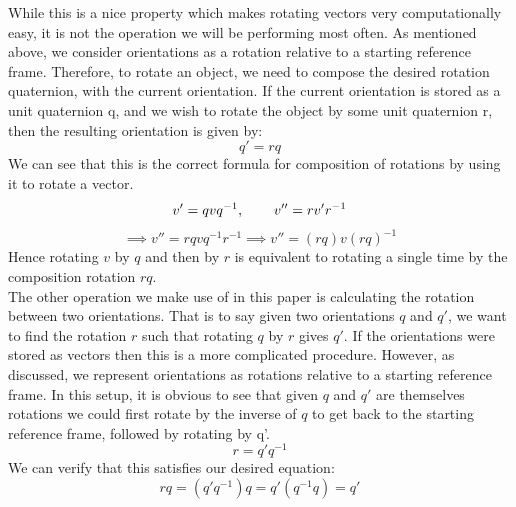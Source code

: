 While this is a nice property which makes rotating vectors very computationally easy, it is not the operation we will be performing most often. As mentioned above, we consider orientations as a rotation relative to a starting reference frame. Therefore, to rotate an object, we need to compose the desired rotation quaternion, with the current orientation. If the current orientation is stored as a unit quaternion q, and we wish to rotate the object by some unit quaternion r, then the resulting orientation is given by:
$$q' = rq$$
We can see that this is the correct formula for composition of rotations by using it to rotate a vector.
$$v' = qvq^{-1}, \operatorname{\operatorname{\: \: \: \:} \operatorname{\: \: \: \:}} v'' = rv'r^{-1}$$
$$\implies v'' = rqvq^{-1}r^{-1} \implies v'' = (rq)v(rq)^{-1}$$
Hence rotating $v$ by $q$ and then by $r$ is equivalent to rotating a single time by the composition rotation $rq$.\\

The other operation we make use of in this paper is calculating the rotation between two orientations. That is to say given two orientations $q$ and $q'$, we want to find the rotation $r$ such that rotating $q$ by $r$ gives $q'$. If the orientations were stored as vectors then this is a more complicated procedure. However, as discussed, we represent orientations as rotations relative to a starting reference frame. In this setup, it is obvious to see that given $q$ and $q'$ are themselves rotations we could first rotate by the inverse of $q$ to get back to the starting reference frame, followed by rotating by q'.
$$r = q'q^{-1}$$
We can verify that this satisfies our desired equation:
$$rq = (q'q^{-1})q = q'(q^{-1}q) = q'$$





